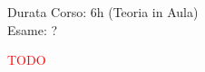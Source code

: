 \documentclass[../uefaC.tex]{subfiles}
\begin{document}

Durata Corso: 6h (Teoria in Aula) \hfill \\
Esame: ?

\textcolor{red}{TODO}
\end{document}
